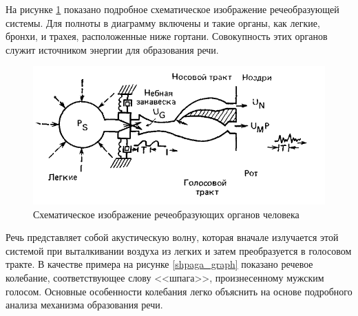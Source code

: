 \documentclass[a4paper,14pt,russian,utf8,nocolumnsxix,nocolumnxxxi,nocolumnxxxii]{eskdtext}
\begin{document}
На рисунке \ref{trakt} показано подробное схематическое изображение речеобразующей системы. Для полноты в диаграмму включены и такие органы, как легкие, бронхи, и трахея, расположенные ниже гортани. Совокупность этих органов служит источником энергии для образования речи.\cite{rabiner1} 
\begin{figure}[ht]	
	\centering
	\includegraphics[width=120mm]{trakt.png}			
	\caption{Схематическое изображение речеобразующих органов человека}
	\label{trakt}
\end{figure}

Речь представляет собой акустическую волну, которая вначале излучается этой системой при выталкивании воздуха из легких и затем преобразуется в голосовом тракте. В качестве примера на рисунке \ref{shpaga_graph} показано речевое колебание, соответствующее слову <<шпага>>, произнесенному мужским голосом. Основные особенности колебания легко объяснить на основе подробного анализа механизма образования речи.
\end{document}
